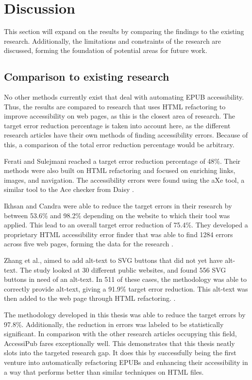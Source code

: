 \section{Discussion}
\label{sec:discussion}
This section will expand on the results by comparing the findings to the existing research. Additionally, the limitations and constraints of the research are discussed, forming the foundation of potential areas for future work. 

\subsection{Comparison to existing research}
No other methods currently exist that deal with automating EPUB accessibility. Thus, the results are compared to research that uses HTML refactoring to improve accessibility on web pages, as this is the closest area of research. The target error reduction percentage is taken into account here, as the different research articles have their own methods of finding accessibility errors. Because of this, a comparison of the total error reduction percentage would be arbitrary.

Ferati and Sulejmani reached a target error reduction percentage of 48\%. Their methods were also built on HTML refactoring and focused on enriching links, images, and navigation. The accessibility errors were found using the aXe tool, a similar tool to the Ace checker from Daisy \cite{Ferati2016}.

Ikhsan and Candra were able to reduce the target errors in their research by between 53.6\% and 98.2\% depending on the website to which their tool was applied. This lead to an overall target error reduction of 75.4\%. They developed a proprietary HTML accessibility error finder that was able to find 1284 errors across five web pages, forming the data for the research \cite{Ikhsan2018}.

Zhang et al., aimed to add alt-text to SVG buttons that did not yet have alt-text. The study looked at 30 different public websites, and found 556 SVG buttons in need of an alt-text. In 511 of these cases, the methodology was able to correctly provide alt-text, giving a 91.9\% target error reduction. This alt-text was then added to the web page through HTML refactoring. \cite{Zhang2024}.

The methodology developed in this thesis was able to reduce the target errors by 97.8\%. Additionally, the reduction in errors was labeled to be statistically significant. In comparison with the other research articles occupying this field, AccessiPub fares exceptionally well. This demonstrates that this thesis neatly slots into the targeted research gap. It does this by successfully being the first venture into automatically refactoring EPUBs and enhancing their accessibility in a way that performs better than similar techniques on HTML files.


